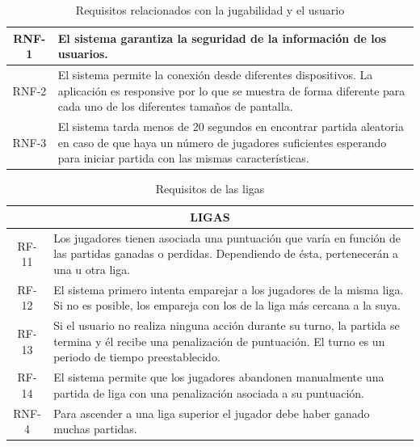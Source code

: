 \begin{table}[H]
\begin{tabular}{|c|p{12cm}|}
RNF-1 & El sistema garantiza la seguridad de la información de los usuarios. \\ \hline
RNF-2 & El sistema permite la conexión desde diferentes dispositivos. La aplicación es responsive por lo que se muestra de forma diferente para cada uno de los diferentes tamaños de pantalla. \\ \hline
RNF-3 & El sistema tarda menos de 20 segundos en encontrar partida aleatoria en caso de que haya un número de jugadores suficientes esperando para iniciar partida con las mismas características. \\ \hline
\end{tabular}
\caption{Requisitos relacionados con la jugabilidad y el usuario}
\label{tabla-usuario}
\end{table}


\begin{table}[H]
\centering
\begin{tabular}{|c|p{12cm}|}
\hline
\multicolumn{2}{|c|}{LIGAS} \\ \hline
RF-11 & Los jugadores tienen asociada una puntuación que varía en función de las partidas ganadas o perdidas. Dependiendo de ésta, pertenecerán a una u otra liga. \\ \hline
RF-12 & El sistema primero intenta emparejar a los jugadores de la misma liga. Si no es posible, los empareja con los de la liga más cercana a la suya. \\ \hline
RF-13 & Si el usuario no realiza ninguna acción durante su turno, la partida se termina y él recibe una penalización de puntuación. El turno es un periodo de tiempo preestablecido. \\ \hline
RF-14 & El sistema permite que los jugadores abandonen manualmente una partida de liga con una penalización asociada a su puntuación. \\ \hline
RNF-4 & Para ascender a una liga superior el jugador debe haber ganado muchas partidas. \\ \hline
\end{tabular}
\caption{Requisitos de las ligas}
\label{tabla-ligas}
\end{table}

